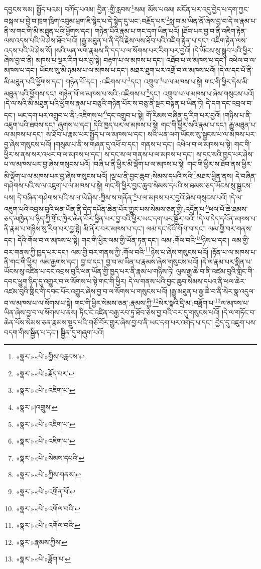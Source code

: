 དབྱངས་སམ། སྤྱོད་པའམ། བཀོད་པའམ། བྱིན་:གྱི་རླབས་\footnote{«སྣར་»«པེ་»གྱིས་བརླབས་}སམ། མོས་པའམ། མངོན་པར་འདུ་བྱེད་པ་དག་ཀྱང་བསྐལ་པ་བྱེ་བ་ཁྲག་ཁྲིག་འབུམ་ཕྲག་ཇི་སྙེད་པ་དེ་སྙེད་དུ་ཡང་:བརྗོད་པར་\footnote{«སྣར་»«པེ་»རྗོད་པར་}སླ་བ་མ་ཡིན་ནོ་ཞེས་བྱ་བ་དེ་ལ་རྣམ་པ་ནི་ས་གང་གི་མི་མཐུན་པའི་ཕྱོགས་དང་། གཉེན་པོའི་རྣམ་པ་གང་དག་ཡིན་པའོ། །ཐོབ་པར་བྱ་བ་ནི་འཇིག་རྟེན་ལས་འདས་པའི་ཡེ་ཤེས་ཐོབ་པའོ། །རྒྱུ་མཐུན་པ་ནི་དེའི་རྗེས་ལས་ཐོབ་པའི་འཇིག་རྟེན་པ་དང་། འཇིག་རྟེན་ལས་འདས་པའི་ཡེ་ཤེས་སོ། །སའི་ཡན་ལག་རྣམས་ནི་དད་པ་ལ་སོགས་པར་རིག་པར་བྱའོ། །དེ་ཡོངས་སུ་སྒྲུབ་པའི་ཕྱིར་ཞེས་བྱ་བ་ནི། མཁས་པ་ལྔར་རིག་པར་བྱ་སྟེ། བརྟག་པ་ལ་མཁས་པ་དང་། འཐོབ་པ་ལ་མཁས་པ་དང་། འཕེལ་བ་ལ་མཁས་པ་དང་། ཡོངས་སུ་མི་ཉམས་པ་ལ་མཁས་པ་དང་། མཐར་ཐུག་པར་འགྲོ་བ་ལ་མཁས་པའོ། །དེ་ལ་དང་པོ་ནི་མི་མཐུན་པའི་ཕྱོགས་དང་། གཉེན་པོ་དང་། :འཇིགས་པ་\footnote{«སྣར་»«པེ་»འཇིག་པ་}དང་། འགྲུབ་\footnote{«སྣར་»།འགྲུས་}པ་ལ་མཁས་པ་སྟེ། གང་གི་ཕྱིར་དེས་མི་མཐུན་པའི་ཕྱོགས་དང་། གཉེན་པོ་ལ་མཁས་པ་སའི་:འཇིགས་པ་\footnote{«སྣར་»«པེ་»འཇིག་པ་}དང་། འགྲུབ་པ་ལ་མཁས་པ་ཞེས་གསུངས་པའོ། །དེ་ལ་སའི་མི་མཐུན་པའི་ཕྱོགས་རྣམ་པ་བཅུའི་གཉེན་པོར་ས་བཅུ་ནི་སྔར་བསྟན་པ་ཡིན་ཏེ། དེ་དག་དང་འབྲལ་བ་དང་། ཡང་དག་པར་འགྲུབ་པ་ནི་:འཇིགས་པ་\footnote{«སྣར་»«པེ་»འཇིག་པ་}དང་འགྲུབ་པ་སྟེ། གོ་རིམས་བཞིན་དུ་རིག་པར་བྱའོ། །གཉིས་པ་ནི་འཇུག་པའི་ཐབས་དང་། ཞུགས་པ་དང་། དེའི་ཁྱད་པར་ལ་མཁས་པ་སྟེ། གང་གི་ཕྱིར་སའི་རྣམ་པ་དང་། རྒྱུ་མཐུན་པ་ལ་མཁས་པ་དང་། ས་ཐོབ་པ་རྣམ་པར་སྤྱོད་པ་ལ་མཁས་པ་དང་། སའི་ཡན་ལག་ཡོངས་སུ་སྦྱངས་པ་ལ་མཁས་པར་བྱ་ཞེས་གསུངས་པའོ། །གསུམ་པ་ནི་ས་གཞན་དུ་འཕོ་བ་དང་། གནས་པ་དང་། འཕེལ་བ་ལ་མཁས་པ་སྟེ། གང་གི་ཕྱིར་ས་ནས་སར་འཕར་བ་ལ་མཁས་པ་དང་། ས་དང་ས་ལ་གནས་པ་ལ་མཁས་པ་དང་། ས་དང་སའི་ཁྱད་པར་ཤེས་པ་ལ་མཁས་པར་བྱ་ཞེས་གསུངས་པའོ། །བཞི་པ་ནི་ཕྱིར་མི་ལྡོག་པ་ལ་མཁས་པ་སྟེ། གང་གི་ཕྱིར་ས་ཐོབ་ནས་ཕྱིར་མི་ལྡོག་པ་ལ་མཁས་པར་བྱ་ཞེས་གསུངས་པའོ། །ལྔ་པ་ནི་བྱང་ཆུབ་:སེམས་དཔའི་སའི་\footnote{«སྣར་»«པེ་»སེམས་དཔའི་}མཐར་ཕྱིན་ནས། དེ་བཞིན་གཤེགས་པའི་ས་ལ་འཇུག་པ་ལ་མཁས་པ་སྟེ། གང་གི་ཕྱིར་བྱང་ཆུབ་སེམས་དཔའི་ས་ཐམས་ཅད་ཡོངས་སུ་སྦྱངས་པས། དེ་བཞིན་གཤེགས་པའི་ས་ལ་ཡེ་ཤེས་:ཀྱིས་ས་གནོན་\footnote{«སྣར་»«པེ་»ཀྱིས་གནས་}པ་ལ་མཁས་པར་བྱའོ་ཞེས་གསུངས་པའོ། །དེ་ལ་འཇུག་པའི་འབྲས་བུའི་ཕན་ཡོན་ནི་དེད་དཔོན་ཆེན་པོར་གྱུར་པས་སེམས་ཅན་གྱི་:འདྲོན་པ་\footnote{«སྣར་»«པེ་»འགྲོན་པོ་}ཕལ་པོ་ཆེ་ཐམས་ཅད་མཁྱེན་པ་ཉིད་ཀྱི་གྲོང་ཁྱེར་ཆེན་པོར་ཕྱིན་པར་བྱ་བའི་ཕྱིར་ཡང་དག་པར་སྦྱོར་བའོ། །དེ་ལ་དེད་དཔོན་མཁས་པ་ནི་རྣམ་པ་གཉིས་སུ་རིག་པར་བྱ་སྟེ། མི་ནོར་བར་མཁས་པ་དང་། ལམ་དང་དེའི་གོལ་བ་དང་། ལམ་གྱི་བར་གནས་དང་། དེའི་གོལ་བ་ལ་མཁས་པ་སྟེ། གང་གི་ཕྱིར་ལམ་གྱི་ཡོན་ཏན་དང་། ལམ་:གོལ་བའི་\footnote{«སྣར་»«པེ་»འགོལ་བའི་}ཉེས་པ་དང་། ལམ་གྱི་བར་གནས་ཀྱི་ཁྱད་པར་དང་། ལམ་གྱི་བར་གནས་ཀྱི་:གོལ་བའི་\footnote{«སྣར་»«པེ་»འགོལ་བའི་}ཉེས་པ་ཞེས་གསུངས་པའོ། །རྟོན་པ་ལ་མཁས་པ་ནི་གང་གི་ཕྱིར། ལམ་རྒྱགས་དང་། བྱ་བ་དང་། བྱ་བ་མ་ཡིན་པ་རྣམས་ཞེས་གསུངས་པའོ། །དེ་ལ་རྣམ་པར་སྨིན་པ་ཡོངས་སུ་འཛིན་པ་དང་འབྲས་བུའི་ཕན་ཡོན་གྱི་ཁྱད་པར་ནི་རྣམ་པ་གཉིས་ཏེ། ལུས་རྒྱ་ཆེ་བ་ནི་འཛམ་བུའི་གླིང་གི་དབང་ཕྱུག་ཉིད་དུ་འགྱུར་བ་ལ་སོགས་པ་སྟེ་གང་གི་ཕྱིར། དེ་ལ་གནས་པའི་བྱང་ཆུབ་སེམས་དཔའ་ནི་ཕལ་ཆེར་འཛམ་བུའི་གླིང་གི་དབང་པོར་འགྱུར་ཞེས་བྱ་བ་ལ་སོགས་པ་གསུངས་པའོ། །རྒྱུ་མཐུན་པ་རྒྱ་ཆེ་བ་ནི་སེར་སྣ་འདུལ་བ་ལ་མཁས་པ་ལ་སོགས་པ་སྟེ། གང་གི་ཕྱིར་སེམས་ཅན་:རྣམས་ཀྱི་\footnote{«སྣར་»རྣམས་ཀྱིས་}སེར་སྣའི་དྲི་མ་:བཟློག་པ་\footnote{«སྣར་»«པེ་»ཟློག་པ་}ལ་མཁས་པ་ཡིན་ཞེས་བྱ་བ་ལ་སོགས་པ་ནས། ཏིང་ངེ་འཛིན་བརྒྱ་རབ་ཏུ་ཐོབ་ཅེས་བྱ་བའི་བར་དུ་གསུངས་པའོ། །དེ་ལ་གཏོང་བ་ཆེན་པོས་སེམས་ཅན་རྣམས་སྡུད་པའི་གཙོ་བོར་གྱུར་ཞེས་བྱ་བ་ནི་ཡང་དག་པར་འགེད་པ་དང་། བྱེད་དུ་འཇུག་པས་བདག་གིས་སྦྱིན་པ་དང་། སྦྱིན་དུ་གཞུག་པའོ། 